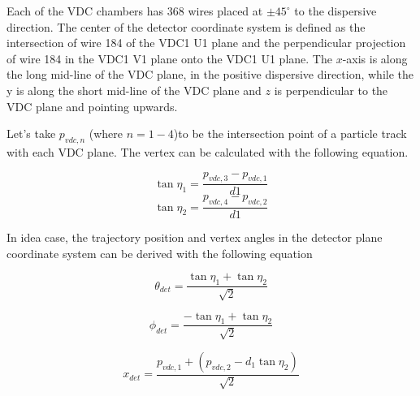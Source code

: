 Each of the VDC chambers has 368 wires placed at $\pm 45 ^{\circ}$  to the dispersive direction. The center of the detector coordinate system is defined as the intersection of wire 184 of the VDC1 U1 plane and the perpendicular projection of wire 184 in the VDC1 V1 plane onto the VDC1 U1 plane. The $x$-axis is along the long  mid-line  of the VDC plane, in the positive dispersive direction, while the y is along the short mid-line of the VDC plane and $z$ is perpendicular to the VDC plane and pointing upwards. 

Let's take $p_{vdc,n}$ (where ${n=1-4}$)to be the  intersection point  of a particle track with each VDC plane. The vertex can be calculated with the following equation. 

\begin{equation}
    \tan \eta_{1} = \frac{p_{vdc,3} - p_{vdc, 1}}{d1}    
\end{equation}
\begin{equation}
    \tan \eta_{2} = \frac{p_{vdc,4} - p_{vdc, 2}}{d1}    
\end{equation}


In idea case, the trajectory position and vertex angles in the detector plane coordinate system can be derived with the following equation 

\begin{equation}
    \theta_{det} = \frac{\tan{\eta_1} + \tan{\eta_2}}{\sqrt{2}}
\end{equation}
    
\begin{equation}
    \phi_{det} =  \frac{-\tan{\eta_1} + \tan{\eta_2}}{\sqrt{2}}
\end{equation}

\begin{equation}
    x_{det} = \frac{p_{vdc,1} + (p_{vdc,2} - d_1\tan{\eta_2})}{\sqrt{2}}
\end{equation}

